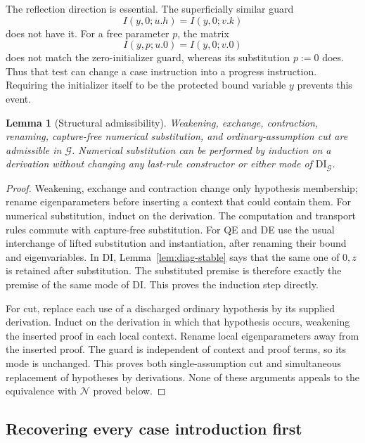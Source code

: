 \documentclass[11pt]{article}
\newtheorem{lemma}[theorem]{Lemma}
\theoremstyle{definition}
\theoremstyle{remark}
\begin{document}
The reflection direction is essential.  The superficially similar guard
\[
 I(y,0;u.h)=I(y,0;v.k)
\]
does not have it.  For a free parameter $p$, the matrix
\[
 I(y,p;u.0)=I(y,0;v.0)
\]
does not match the zero-initializer guard, whereas its substitution
$p:=0$ does.  Thus that test can change a case instruction into a progress
instruction.  Requiring the initializer itself to be the protected bound
variable $y$ prevents this event.

\begin{lemma}[Structural admissibility]
\label{lem:diag-structural}
Weakening, exchange, contraction, renaming, capture-free numerical
substitution, and ordinary-assumption cut are admissible in $\mathcal G$.
Numerical substitution can be performed by induction on a derivation
without changing any last-rule constructor or either mode of
$\mathrm{DI}_{\mathcal G}$.
\end{lemma}
\begin{proof}
Weakening, exchange and contraction change only hypothesis membership;
rename eigenparameters before inserting a context that could contain
them.  For numerical substitution, induct on the derivation.  The
computation and transport rules commute with capture-free substitution.
For QE and DE use the usual interchange of lifted substitution and
instantiation, after renaming their bound and eigenvariables.  In DI,
Lemma~\ref{lem:diag-stable} says that the same one of $0,z$ is retained
after substitution.  The substituted premise is therefore exactly the
premise of the same mode of DI.  This proves the induction step directly.

For cut, replace each use of a discharged ordinary hypothesis by its
supplied derivation.  Induct on the derivation in which that hypothesis
occurs, weakening the inserted proof in each local context.  Rename local
eigenparameters away from the inserted proof.  The guard is independent
of context and proof terms, so its mode is unchanged.  This proves both
single-assumption cut and simultaneous replacement of hypotheses by
derivations.  None of these arguments appeals to the equivalence with
$\mathcal N$ proved below.
\end{proof}

\subsection{Recovering every case introduction first}
\end{document}
